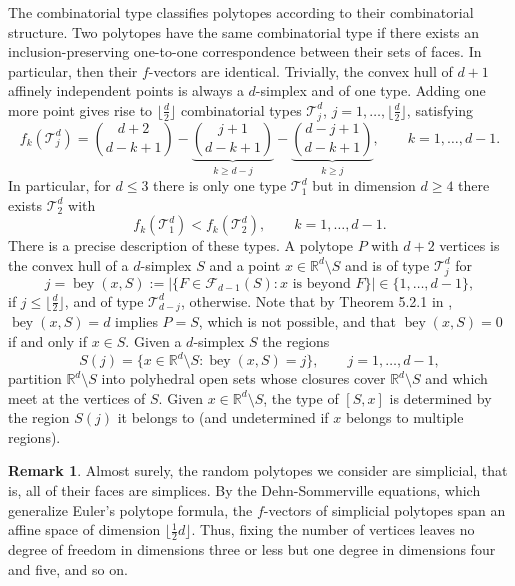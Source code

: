 \documentclass[12pt]{article}
\newcommand{\IR}{\mathds{R}}
\DeclareMathOperator{\bey}{bey}
\def\cF{{\mathcal F}}
\def\cT{{\mathcal T}}
\theoremstyle{definition}
\newtheorem{remark}[theorem]{Remark}
\begin{document}
The combinatorial type classifies polytopes according to their combinatorial structure. Two polytopes have the same combinatorial type if there exists an inclusion-preserving one-to-one correspondence between their sets of faces. In particular, then their $f$-vectors are identical. Trivially, the convex hull of $d+1$ affinely independent points is always a $d$-simplex and of one type. Adding one more point gives rise to $\lfloor \frac d2 \rfloor$ combinatorial types $\cT_j^d$, $j=1, \dots, \lfloor \frac d2  \rfloor$, satisfying
$$
f_k(\cT_j^d)
=
\binom{d+2}{d-k+1} - \underbrace{\binom{j+1}{d-k+1}}_{ k\geq d-j}  - \underbrace{\binom{d-j+1}{d-k+1}}_{k \geq j},\qquad k=1,\dots,d-1.
$$
In particular, for $d\leq 3$ there is only one type $\cT^d_1$ but in dimension $d \geq 4$ there exists $\cT^d_2$ with
\begin{equation} \label{eq:types}
f_k(\cT_1^d) < f_k(\cT_2^d),\qquad k =1, \dots, d-1.
\end{equation}
There is a precise description of these types.  A polytope $P$ with $d+2$ vertices is the convex hull of a $d$-simplex $S$ and a point $x\in\IR^d\setminus S$ and is of type $\cT^d_j$ for
\[
j=\bey(x,S):=|\{F\in \cF_{d-1}(S)\colon x \text{ is beyond }F\}|\in \{1,\dots,d-1\},
\]
if $j\le \lfloor \frac{d}{2}\rfloor$, and of type $\cT^d_{d-j}$, otherwise. Note that by Theorem 5.2.1 in \cite{Gruenbaum}, $\bey(x,S)=d$ implies $P=S$, which is not possible, and that $\bey(x,S)=0$ if and only if $x\in S$.  Given a $d$-simplex $S$ the regions
\begin{equation} \label{eq:beyond}
S(j)=\{x\in\IR^d\setminus S\colon \bey(x,S)=j\},\qquad j=1,\dots,d-1,
\end{equation}
partition $\IR^d\setminus S$ into polyhedral open sets whose closures cover $\IR^d\setminus S$ and which meet at the vertices of $S$. Given $x\in \IR^d\setminus S$, the type of $[S,x]$ is determined by the region $S(j)$ it belongs to (and undetermined if $x$ belongs to multiple regions). 

\begin{remark}
Almost surely, the random polytopes we consider are simplicial, that is, all of their faces are simplices. By the Dehn-Sommerville equations, which generalize Euler's polytope formula, the $f$-vectors of simplicial polytopes span an affine space of dimension $\lfloor \frac{1}{2}d\rfloor$. Thus, fixing the number of vertices leaves no degree of freedom in dimensions three or less but one degree in dimensions four and five, and so on. 
\end{remark}
\end{document}
